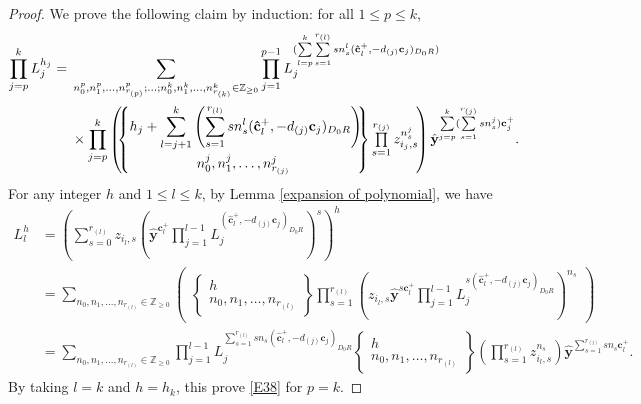 \documentclass[10pt,a4paper]{amsart}
\newcommand{\Z}{\mathbb{Z}}
\numberwithin{equation}{section}
\begin{document}
\begin{proof}
 We prove the following claim by induction: for all $1\le p\le k$,
\begin{align}
\prod\limits_{j=p}^{k}L_j^{h_j}
={}&\sum_{n_0^p,n_{1}^{p},\dots,n_{r_{(p)}}^p;\dots;n_0^{k},n_{1}^{k},\dots,n_{r_{(k)}}^k\in\mathbb{Z}_{\ge 0}}\prod_{j=1}^{p-1}L_j^{(\sum\limits_{l=p}^{k}\sum\limits_{s=1}^{r_{(l)}}s n_{s}^{l}(\mathbf{\hat{c}}_{l}^+,-d_{(j)}\mathbf{c}_{j})_{D_0R})}\nonumber\\
&\times \prod\limits_{j=p}^{k}\begin{pmatrix}\!\!
 \begin{Bmatrix}\displaystyle h_j+\sum\limits_{l=j+1}^{k}\left(\sum\limits_{s=1}^{r_{(l)}}s n_{s}^{l}(\mathbf{\hat{c}}_{l}^+,-d_{(j)}\mathbf{c}_{j})_{D_0R}\right)\!\!\vspace{1mm}\\ n_0^j,n_{1}^j,\dots,n_{r_{(j)}}^j\end{Bmatrix}\prod\limits_{s=1}^{r_{(j)}}z_{i_j,s}^{n_s^j}\!
\end{pmatrix}\hat{\mathbf{y}}^{\sum\limits_{j=p}^{k}(\sum\limits_{s=1}^{r_{(j)}}s n_s^j)\mathbf{c}_{j}^+}.\!\!\!\!\label{E38}
 \end{align}
 For any integer $h$ and $1\leq l\leq k$, by Lemma \ref{expansion of polynomial}, we have
 \begin{align*}
 L_l^{h}&=\left(\sum\limits_{s=0}^{r_{(l)}}z_{i_l,s}
 \left(\hat{\mathbf{y}}^{\mathbf{c}_{l}^+}\prod\limits_{j=1}^{l-1}L_j^{(\mathbf{\hat{c}}_{l}^+,-d_{(j)}\mathbf{c}_{j})_{D_0R}}\right)^s\right)^{h} \\ &=\sum\limits_{n_{0},n_1,\dots,n_{r_{(l)}}\in\mathbb{Z}_{\ge 0}}\begin{pmatrix}\begin{Bmatrix}h\\ n_0,n_1,\dots,n_{r_{(l)}}\end{Bmatrix}\prod\limits_{s=1}^{r_{(l)}}\left(z_{i_l,s}\hat{\mathbf{y}}^{s \mathbf{c}_{l}^+}\prod\limits_{j=1}^{l-1}L_j^{s(\mathbf{\hat{c}}_{l}^+,-d_{(j)}\mathbf{c}_{j})_{D_0R}}\right)^{n_s}\end{pmatrix} \\
  &=\sum\limits_{n_{0},n_1,\dots,n_{r_{(l)}}\in \Z_{\geq 0}}\prod\limits_{j=1}^{l-1}L_j^{\sum\limits_{s=1}^{r_{(l)}}s n_s(\mathbf{\hat{c}}_{l}^+,-d_{(j)}\mathbf{c}_{j})_{D_0R}}\begin{Bmatrix}h\\ n_0,n_1,\dots,n_{r_{(l)}}\end{Bmatrix}\left(\prod\limits_{s=1}^{r_{(l)}}z_{i_l,s}^{n_s}\right)\hat{\mathbf{y}}^{\sum\limits_{s=1}^{r_{(l)}}s n_{s}\mathbf{c}_{l}^+}.
 \end{align*}
 By taking $l=k$ and $h=h_k$, this prove \eqref{E38} for $p=k$.


\end{proof}
\end{document}
